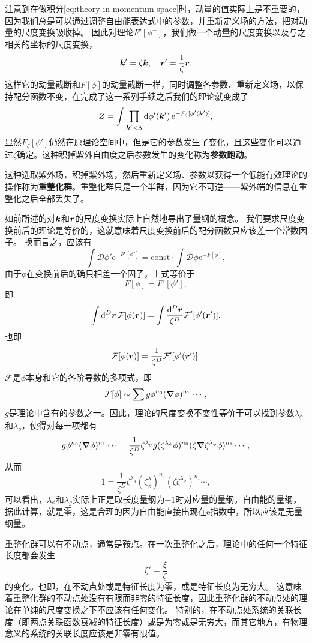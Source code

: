 \documentclass[hyperref, UTF8, a4paper]{ctexart}
\newcommand*{\ee}{\mathrm{e}}
\newcommand*{\const}{\mathrm{const}}
\newcommand*{\fd}[1]{\mathcal{D}{#1}}
\begin{document}
注意到在做积分\eqref{eq:theory-in-momentum-space}时，动量的值实际上是不重要的，因为我们总是可以通过调整自由能表达式中的参数，并重新定义场的方法，把对动量的尺度变换吸收掉。
因此对理论$F'[\phi^-]$，我们做一个动量的尺度变换以及与之相关的坐标的尺度变换，
\[
    \vb*{k}' = \zeta \vb*{k}, \quad \vb*{r}' = \frac{1}{\zeta} \vb*{r},
\]
这样它的动量截断和$F[\phi]$的动量截断一样，同时调整各参数、重新定义场，以保持配分函数不变，在完成了这一系列手续之后我们的理论就变成了
\[
    Z = \int \prod_{\vb*{k'} < \Lambda} \dd{\phi'(\vb*{k}')} \ee^{-F_\zeta [\phi'(\vb*{k}')]},
\]
显然$F_\zeta[\phi']$仍然在原理论空间中，但是它的参数发生了变化，且这些变化可以通过$\zeta$确定。这种积掉紫外自由度之后参数发生的变化称为\textbf{参数跑动}。

这种选取紫外场，积掉紫外场，然后重新定义场、参数以获得一个低能有效理论的操作称为\textbf{重整化群}。重整化群只是一个半群，因为它不可逆——紫外端的信息在重整化之后全部丢失了。

如前所述的对$\vb*{k}$和$\vb*{r}$的尺度变换实际上自然地导出了量纲的概念。
我们要求尺度变换前后的理论是等价的，这就意味着尺度变换前后的配分函数只应该差一个常数因子。
换而言之，应该有
\[
    \int \fd{\phi'} \ee^{- F'[\phi']} = \const \cdot \int \fd{\phi} \ee^{ - F[\phi]},
\]
由于$\phi$在变换前后的确只相差一个因子，上式等价于
\[
    F[\phi] = F'[\phi'],
\]
即
\[
    \int \dd[D]{\vb*{r}} \mathcal{F}[\phi(\vb*{r})] = \int \frac{\dd[D]{\vb*{r}}}{\zeta^D} \mathcal{F}' [\phi'(\vb*{r}')],
\]
也即
\[
    \mathcal{F}[\phi(\vb*{r})] = \frac{1}{\zeta^D} \mathcal{F}' [\phi'(\vb*{r}')].
\]
$\mathcal{F}$是$\phi$本身和它的各阶导数的多项式，即
\[
    \mathcal{F}[\phi] \sim \sum g \phi^{n_0} (\grad{\phi})^{n_1} \cdots,
\]
$g$是理论中含有的参数之一。因此，理论的尺度变换不变性等价于可以找到参数$\lambda_\phi$和$\lambda_g$，使得对每一项都有
\[
    g \phi^{n_0} (\grad{\phi})^{n_1} \cdots = \frac{1}{\zeta^D} \zeta^{\lambda_g} g (\zeta^{\lambda_\phi} \phi)^{n_0} (\zeta \grad{\zeta^{\lambda_\phi} \phi})^{n_1} \cdots, 
\]
从而
\[
    1 = \frac{1}{\zeta^D} \zeta^{\lambda_g} (\zeta^\lambda_\phi)^{n_0} (\zeta \zeta^{\lambda_\phi})^{n_1} \cdots,
\]
可以看出，$\lambda_\phi$和$\lambda_g$实际上正是取长度量纲为$-1$时对应量的量纲。自由能的量纲，据此计算，就是零，这是合理的因为自由能直接出现在$\ee$指数中，所以应该是无量纲量。

重整化群可以有不动点，通常是鞍点。在一次重整化之后，理论中的任何一个特征长度都会发生
\[
    \xi' = \frac{\xi}{\zeta}
\]
的变化。也即，在不动点处或是特征长度为零，或是特征长度为无穷大。
这意味着重整化群的不动点处没有有限而非零的特征长度，因此重整化群的不动点处的理论在单纯的尺度变换之下不应该有任何变化。
特别的，在不动点处系统的关联长度（即两点关联函数衰减的特征长度）或是为零或是无穷大，而其它地方，有物理意义的系统的关联长度应该是非零有限值。
\end{document}

